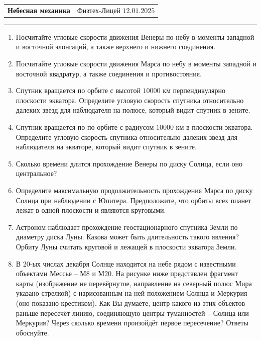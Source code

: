 \documentclass[12pt]{article}
\begin{document}
\begin{tabularx}{\textwidth}{Xr}
{\Large \textbf{Небесная механика}} & Физтех-Лицей $12.01.2025$ \\
\end{tabularx}
\noindent\rule{\textwidth}{0.4pt}
\begin{enumerate}
    \item Посчитайте угловые скорости движения Венеры по небу в моменты западной и восточной элонгаций, а также верхнего и нижнего соединения.
    \item Посчитайте угловые скорости движения Марса по небу в моменты западной и восточной квадратур, а также соединения и противостояния.
    \item Спутник вращается по орбите с высотой $10000$ км перпендикулярно плоскости экватора. Определите угловую скорость спутника относительно далеких звезд для наблюдателя на полюсе, который видит спутник в зените.
    \item Спутник вращается по по орбите с радиусом $10000$ км в плоскости экватора. Определите угловую скорость спутника относительно далеких звезд для наблюдателя на экваторе, который видит спутник в зените.
    \item Сколько времени длится прохождение Венеры по диску Солнца, если оно центральное? 
    \item Определите максимальную продолжительность прохождения Марса по диску Солнца при наблюдении с Юпитера. Предположите, что орбиты всех планет лежат в одной плоскости и являются круговыми.
    \item Астроном наблюдает прохождение геостационарного спутника Земли по диаметру диска Луны. Какова может быть длительность такого явления? Орбиту Луны считать круговой и лежащей в плоскости экватора Земли. 
    \item В 20-ых числах декабря Солнце находится на небе рядом с известными объектами Мессье – М$8$ и М$20$. На рисунке ниже представлен фрагмент карты (изображение не перевёрнутое, направление на северный полюс Мира указано стрелкой) с нарисованным на ней положением Солнца и Меркурия (оно показано крестиком). Как Вы думаете, центр какого из этих объектов раньше пересечёт линию, соединяющую центры туманностей – Солнца или Меркурия? Через сколько времени произойдёт первое пересечение? Ответы обоснуйте.
    \begin{figure}[ht]

\end{figure}
\end{enumerate}
\end{document}
